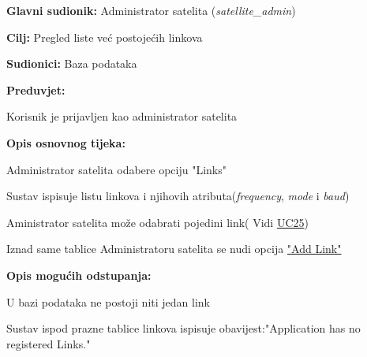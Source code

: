 			\noindent {}
			\begin{packed_item}
				
				\item \textbf{Glavni sudionik: }Administrator satelita (\textit{satellite\_admin})
				\item  \textbf{Cilj: }Pregled liste već postojećih linkova
				\item  \textbf{Sudionici: }Baza podataka
				\item  \textbf{Preduvjet: }
				\begin{packed_enum}
					\item Korisnik je prijavljen kao administrator satelita	\end{packed_enum}
				\item  \textbf{Opis osnovnog tijeka: }
				
				\item[] \begin{packed_enum}
					
					\item Administrator satelita odabere opciju "Links"
					\item Sustav ispisuje listu linkova i njihovih atributa(\textit{frequency}, \textit{ mode} i \textit{baud})
					\item Aministrator satelita može odabrati pojedini link( Vidi \hyperref[UC25] {UC25})
					
					\item Iznad same tablice Administratoru satelita se nudi opcija \hyperref[UC16]{"Add Link"}
					
				\end{packed_enum}
				
				\item  \textbf{Opis mogućih odstupanja: }
				
				\item[] \begin{packed_enum}
					
					\item[1] U bazi podataka ne postoji niti jedan link
					\item[ ] \begin{packed_enum}
						
						\item[1.1] Sustav ispod prazne tablice linkova ispisuje obavijest:\newline "Application has no registered Links." 
					\end{packed_enum}
				\end{packed_enum}
			\end{packed_item}
